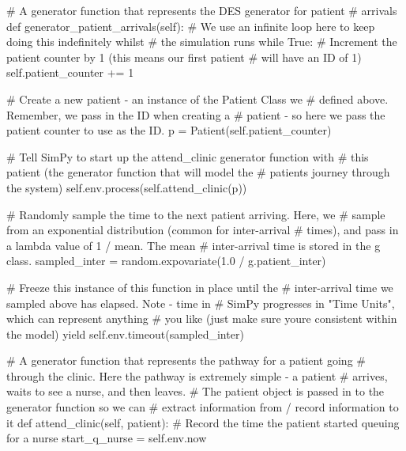 \documentclass[
  letterpaper,
  DIV=11,
  numbers=noendperiod]{scrreprt}
\newenvironment{Shaded}{}{}
\newcommand{\CommentTok}[1]{\textcolor[rgb]{0.42,0.45,0.49}{#1}}
\newcommand{\ControlFlowTok}[1]{\textcolor[rgb]{0.84,0.23,0.29}{#1}}
\newcommand{\DecValTok}[1]{\textcolor[rgb]{0.00,0.36,0.77}{#1}}
\newcommand{\FloatTok}[1]{\textcolor[rgb]{0.00,0.36,0.77}{#1}}
\newcommand{\KeywordTok}[1]{\textcolor[rgb]{0.84,0.23,0.29}{#1}}
\newcommand{\NormalTok}[1]{\textcolor[rgb]{0.14,0.16,0.18}{#1}}
\newcommand{\OperatorTok}[1]{\textcolor[rgb]{0.14,0.16,0.18}{#1}}
\newcommand{\VariableTok}[1]{\textcolor[rgb]{0.89,0.38,0.04}{#1}}
\begin{document}
\begin{Shaded}
\begin{Highlighting}[]
    \CommentTok{\# A generator function that represents the DES generator for patient}
    \CommentTok{\# arrivals}
    \KeywordTok{def}\NormalTok{ generator\_patient\_arrivals(}\VariableTok{self}\NormalTok{):}
        \CommentTok{\# We use an infinite loop here to keep doing this indefinitely whilst}
        \CommentTok{\# the simulation runs}
        \ControlFlowTok{while} \VariableTok{True}\NormalTok{:}
            \CommentTok{\# Increment the patient counter by 1 (this means our first patient}
            \CommentTok{\# will have an ID of 1)}
            \VariableTok{self}\NormalTok{.patient\_counter }\OperatorTok{+=} \DecValTok{1}

            \CommentTok{\# Create a new patient {-} an instance of the Patient Class we}
            \CommentTok{\# defined above.  Remember, we pass in the ID when creating a}
            \CommentTok{\# patient {-} so here we pass the patient counter to use as the ID.}
\NormalTok{            p }\OperatorTok{=}\NormalTok{ Patient(}\VariableTok{self}\NormalTok{.patient\_counter)}

            \CommentTok{\# Tell SimPy to start up the attend\_clinic generator function with}
            \CommentTok{\# this patient (the generator function that will model the}
            \CommentTok{\# patient\textquotesingle{}s journey through the system)}
            \VariableTok{self}\NormalTok{.env.process(}\VariableTok{self}\NormalTok{.attend\_clinic(p))}

            \CommentTok{\# Randomly sample the time to the next patient arriving.  Here, we}
            \CommentTok{\# sample from an exponential distribution (common for inter{-}arrival}
            \CommentTok{\# times), and pass in a lambda value of 1 / mean.  The mean}
            \CommentTok{\# inter{-}arrival time is stored in the g class.}
\NormalTok{            sampled\_inter }\OperatorTok{=}\NormalTok{ random.expovariate(}\FloatTok{1.0} \OperatorTok{/}\NormalTok{ g.patient\_inter)}

            \CommentTok{\# Freeze this instance of this function in place until the}
            \CommentTok{\# inter{-}arrival time we sampled above has elapsed.  Note {-} time in}
            \CommentTok{\# SimPy progresses in "Time Units", which can represent anything}
            \CommentTok{\# you like (just make sure you\textquotesingle{}re consistent within the model)}
            \ControlFlowTok{yield} \VariableTok{self}\NormalTok{.env.timeout(sampled\_inter)}

    \CommentTok{\# A generator function that represents the pathway for a patient going}
    \CommentTok{\# through the clinic.  Here the pathway is extremely simple {-} a patient}
    \CommentTok{\# arrives, waits to see a nurse, and then leaves.}
    \CommentTok{\# The patient object is passed in to the generator function so we can}
    \CommentTok{\# extract information from / record information to it}
    \KeywordTok{def}\NormalTok{ attend\_clinic(}\VariableTok{self}\NormalTok{, patient):}
        \CommentTok{\# Record the time the patient started queuing for a nurse}
\NormalTok{        start\_q\_nurse }\OperatorTok{=} \VariableTok{self}\NormalTok{.env.now}


\end{Highlighting}
\end{Shaded}
\end{document}
